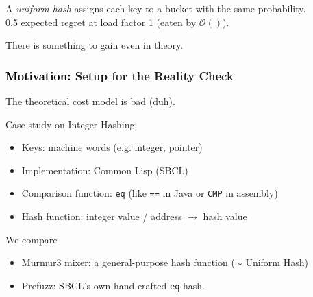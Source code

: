 \documentclass[onlytextwidth,usepdftitle=false]{beamer}
\newcommand\inlinett[1]{\texttt{\fontsize{10pt}{12pt}\selectfont #1}}
\newcommand\Motivation{Motiv\hspace{-0.06em}a\hspace{-0.03em}tion}
\newcommand*\lisp[1]{\inlinett{#1}}
\newcommand\mglconclusion[1]{\textcolor{mglred2}{\textbf{\maltese} #1}}
\begin{document}
\begin{frame}[fragile]
\pause
A \emph{uniform hash} assigns each key to a bucket with the same probability.\\
0.5 expected regret at load factor 1 (eaten by $\mathcal{O()}$).

\mglconclusion{There is something to gain even in theory.}
\end{frame}

\begin{frame}
\frametitle{\textcolor{black}{\Motivation:} Setup for the Reality Check}
The theoretical cost model is bad (duh).

Case-study on Integer Hashing:
\begin{itemize}
\item Keys: machine words (e.g. integer, pointer)
\item Implementation: Common Lisp (SBCL)
\item Comparison function: \lisp{eq} (like \inlinett{==} in Java or \inlinett{CMP} in assembly)
\item Hash function: integer value / address $\rightarrow$ hash value
\end{itemize}

We compare
\begin{itemize}
\item \textcolor{murmurhashcolor}{Murmur}3 mixer: a general-purpose hash function ($\sim$ Uniform Hash)
\item \textcolor{prefuzzhashcolor}{Prefuzz}: SBCL's own hand-crafted \lisp{eq} hash.
\end{itemize}
\end{frame}
\end{document}
